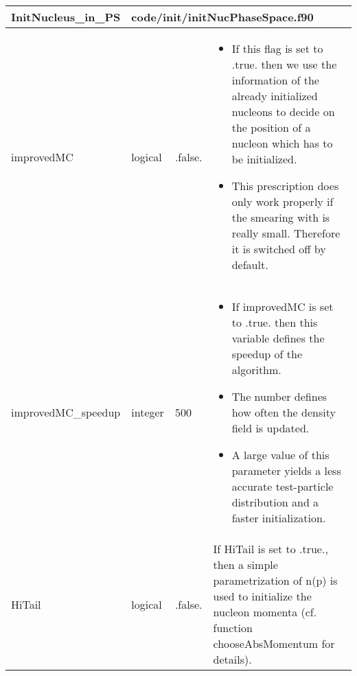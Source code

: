 \documentclass{article}
\begin{document}

\begin{longtable}{llll}
\toprule
\textbf{\large{InitNucleus\_in\_PS}} & \multicolumn{3}{l}{\footnotesize{code/init/initNucPhaseSpace.f90}}\\*
\midrule
\endfirsthead
\midrule
\endhead
improvedMC & \begin{minipage}[t]{2cm}logical\end{minipage} & \begin{minipage}[t]{2cm}.false.\end{minipage} & \begin{minipage}[t]{12cm}\begin{itemize}\leftmargin0em\itemindent0pt\item If this flag is set to .true. then we use the information of the already   initialized nucleons to decide on the position of a nucleon which has to   be initialized.\item This prescription does only work properly if the smearing with is really   small. Therefore it is switched off by default.\end{itemize}\end{minipage}\\*
\midrule
improvedMC\_speedup & \begin{minipage}[t]{2cm}integer\end{minipage} & \begin{minipage}[t]{2cm}500\end{minipage} & \begin{minipage}[t]{12cm}\begin{itemize}\leftmargin0em\itemindent0pt\item If improvedMC  is set to .true. then this variable defines   the speedup of the algorithm.\item The number defines how often the density field is updated.\item A large value of  this parameter yields a less accurate test-particle   distribution and a faster initialization.\end{itemize}\end{minipage}\\*
\midrule
HiTail & \begin{minipage}[t]{2cm}logical\end{minipage} & \begin{minipage}[t]{2cm}.false.\end{minipage} & \begin{minipage}[t]{12cm}If HiTail is set to .true., then a simple parametrization of n(p) is used to initialize the nucleon momenta (cf. function chooseAbsMomentum for details).\end{minipage}\\*

\end{longtable}
\end{document}
